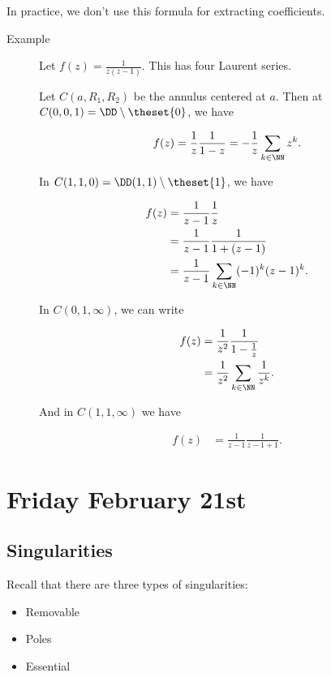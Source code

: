 In practice, we don't use this formula for extracting coefficients.

\begin{description}
\item[Example]
Let \(f(z) = \frac{1}{z(z-1)}\). This has four Laurent series.

Let \(C(a, R_1, R_2)\) be the annulus centered at \(a\). Then at
\(C(0, 0, 1) = \DD\setminus \theset{0}\), we have

\begin{align*}
f(z) = \frac 1 z \frac 1 {1-z} = -\frac 1 z \sum_{k\in \NN} z^k
.\end{align*}

In \(C(1, 1, 0) = \DD(1, 1) \setminus\theset{1}\), we have

\begin{align*}
f(z) 
&= \frac 1 {z-1} \frac 1 z \\
&= \frac 1 {z-1} \frac 1 {1 + (z-1)} \\
&= \frac 1 {z-1} \sum_{k\in \NN} (-1)^k (z-1)^k
.\end{align*}

In \(C(0, 1, \infty)\), we can write

\begin{align*}
f(z) 
&= \frac 1 {z^2} \frac 1 {1 - \frac 1 z} \\
&= \frac 1 {z^2} \sum_{k\in \NN} \frac 1 {z^k}
.\end{align*}

And in \(C(1,1,\infty)\) we have

\begin{align*}
f(z) &= \frac 1 {z-1} \frac{1}{z-1+1}
.\end{align*}
\end{description}

\hypertarget{friday-february-21st}{%
\section{Friday February 21st}\label{friday-february-21st}}

\hypertarget{singularities-1}{%
\subsection{Singularities}\label{singularities-1}}

Recall that there are three types of singularities:

\begin{itemize}
\tightlist
\item
  Removable
\item
  Poles
\item
  Essential
\end{itemize}

